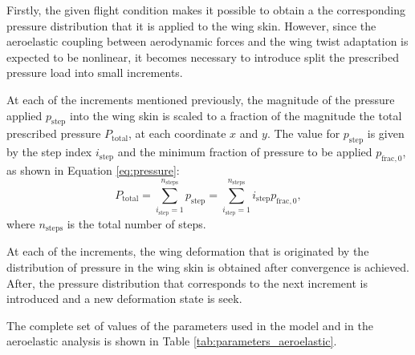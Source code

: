     Firstly, the given flight condition makes it possible to obtain a the corresponding pressure distribution that it is applied to the wing skin. However, since the aeroelastic coupling between aerodynamic forces and the wing twist adaptation is expected to be nonlinear, it becomes necessary to introduce split the prescribed pressure load into small increments.

    At each of the increments mentioned previously, the magnitude of the pressure applied $p_{\mathrm{step}}$ into the wing skin is scaled to a fraction of the magnitude the total prescribed pressure $P_{\mathrm{total}}$, at each coordinate $x$ and $y$. The value for $p_{\mathrm{step}}$ is given by the step index $i_{\mathrm{step}}$ and the minimum fraction of pressure to be applied $p_{\mathrm{frac,0}}$, as shown in Equation \ref{eq:pressure}:
    \begin{equation}
      P_{\mathrm{total}} = \sum_{i_{\mathrm{step}} = 1}^{n_{\mathrm{steps}}} p_{\mathrm{step}} = \sum_{i_{\mathrm{step}} = 1}^{n_{\mathrm{steps}}} i_{\mathrm{step}} p_{\mathrm{frac,0}},
      \label{eq:pressure}
    \end{equation}
    where $n_{\mathrm{steps}}$ is the total number of steps.

    At each of the increments, the wing deformation that is originated by the distribution of pressure in the wing skin is obtained after convergence is achieved. After, the pressure distribution that corresponds to the next increment is introduced and a new deformation state is seek.

    The complete set of values of the parameters used in the model and in the aeroelastic analysis is shown in Table \ref{tab:parameters_aeroelastic}.


